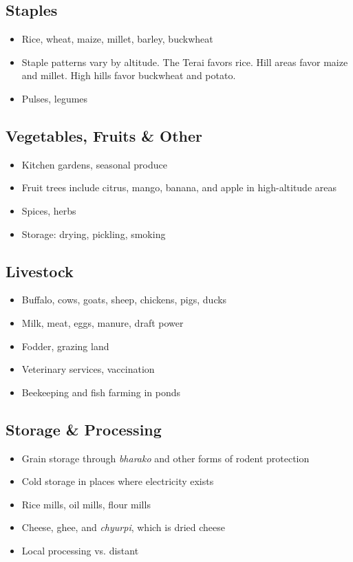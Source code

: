 \documentclass[11pt,a4paper]{article}
\begin{document}
\subsection{Staples}
\begin{itemize}
    \item Rice, wheat, maize, millet, barley, buckwheat
    \item Staple patterns vary by altitude. The Terai favors rice. Hill areas favor maize and millet. High hills favor buckwheat and potato.
    \item Pulses, legumes
\end{itemize}

\subsection{Vegetables, Fruits \& Other}
\begin{itemize}
    \item Kitchen gardens, seasonal produce
    \item Fruit trees include citrus, mango, banana, and apple in high-altitude areas
    \item Spices, herbs
    \item Storage: drying, pickling, smoking
\end{itemize}

\subsection{Livestock}
\begin{itemize}
    \item Buffalo, cows, goats, sheep, chickens, pigs, ducks
    \item Milk, meat, eggs, manure, draft power
    \item Fodder, grazing land
    \item Veterinary services, vaccination
    \item Beekeeping and fish farming in ponds
\end{itemize}

\subsection{Storage \& Processing}
\begin{itemize}
    \item Grain storage through \textit{bharako} and other forms of rodent protection
    \item Cold storage in places where electricity exists
    \item Rice mills, oil mills, flour mills
    \item Cheese, ghee, and \textit{chyurpi}, which is dried cheese
    \item Local processing vs. distant
\end{itemize}
\end{document}
